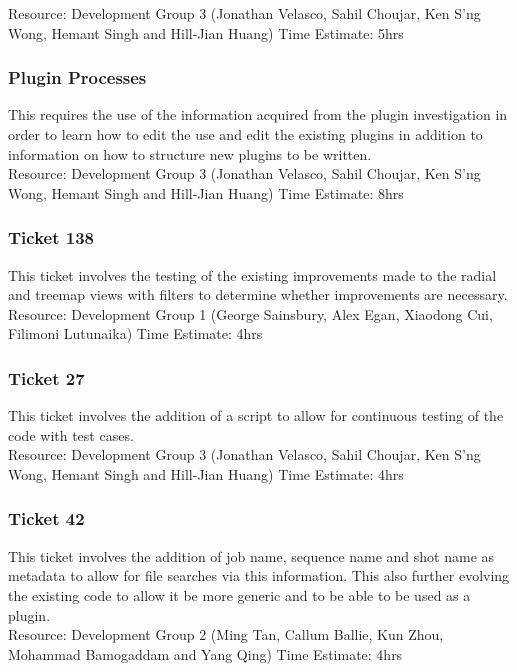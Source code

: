 \documentclass{article}
\begin{document}
	Resource: Development Group 3 (Jonathan Velasco, Sahil Choujar, Ken S'ng Wong, Hemant Singh and Hill-Jian Huang)
	Time Estimate: 5hrs

\subsubsection{Plugin Processes}
	This requires the use of the information acquired from the plugin investigation in order to learn how to edit the use and edit the existing plugins in addition to information on how to structure new plugins to be written.\\
	
	Resource: Development Group 3 (Jonathan Velasco, Sahil Choujar, Ken S'ng Wong, Hemant Singh and Hill-Jian Huang)
	Time Estimate: 8hrs

\subsubsection{Ticket 138}
	This ticket involves the testing of the existing improvements made to the radial and treemap views with filters to determine whether improvements are necessary.\\
	
	Resource: Development Group 1 (George Sainsbury, Alex Egan, Xiaodong Cui, Filimoni Lutunaika)
	Time Estimate: 4hrs

\subsubsection{Ticket 27}
	This ticket involves the addition of a script to allow for continuous testing of the code with test cases.\\
	
	Resource: Development Group 3 (Jonathan Velasco, Sahil Choujar, Ken S'ng Wong, Hemant Singh and Hill-Jian Huang)
	Time Estimate: 4hrs

\subsubsection{Ticket 42}
	This ticket involves the addition of job name, sequence name and shot name as metadata to allow for file searches via this information. This also further evolving the existing code to allow it be more generic and to be able to be used as a plugin.\\
	
	Resource: Development Group 2 (Ming Tan, Callum Ballie, Kun Zhou, Mohammad Bamogaddam and Yang Qing)
	Time Estimate: 4hrs
\end{document}
